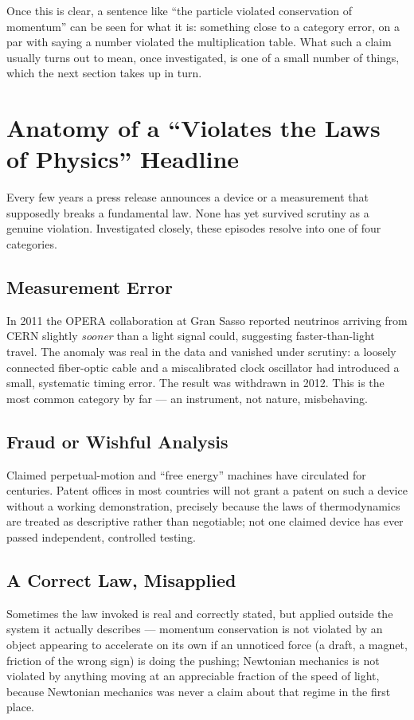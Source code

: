 Once this is clear, a sentence like ``the particle violated conservation of
momentum'' can be seen for what it is: something close to a category
error, on a par with saying a number violated the multiplication table.
What such a claim usually turns out to mean, once investigated, is one of
a small number of things, which the next section takes up in turn.

\section{Anatomy of a ``Violates the Laws of Physics'' Headline}
\label{sec:violations}

Every few years a press release announces a device or a measurement that
supposedly breaks a fundamental law. None has yet survived scrutiny as a
genuine violation. Investigated closely, these episodes resolve into one of
four categories.

\subsection{Measurement Error}

In 2011 the OPERA collaboration at Gran Sasso reported neutrinos arriving
from CERN slightly \emph{sooner} than a light signal could, suggesting
faster-than-light travel. The anomaly was real in the data and vanished
under scrutiny: a loosely connected fiber-optic cable and a miscalibrated
clock oscillator had introduced a small, systematic timing error. The
result was withdrawn in 2012. This is the most common category by far ---
an instrument, not nature, misbehaving.

\subsection{Fraud or Wishful Analysis}

Claimed perpetual-motion and ``free energy'' machines have circulated for
centuries. Patent offices in most countries will not grant a patent on such
a device without a working demonstration, precisely because the laws of
thermodynamics are treated as descriptive rather than negotiable; not one
claimed device has ever passed independent, controlled testing.

\subsection{A Correct Law, Misapplied}

Sometimes the law invoked is real and correctly stated, but applied outside
the system it actually describes --- momentum conservation is not violated
by an object appearing to accelerate on its own if an unnoticed force (a
draft, a magnet, friction of the wrong sign) is doing the pushing; Newtonian
mechanics is not violated by anything moving at an appreciable fraction of
the speed of light, because Newtonian mechanics was never a claim about
that regime in the first place.

